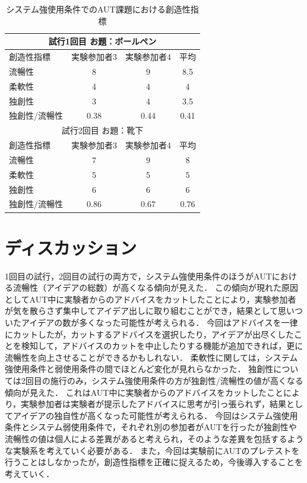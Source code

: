 \documentclass[a4paper]{jarticle}
\begin{document}
\begin{table}[h]
    \caption{システム強使用条件でのAUT課題における創造性指標}
    \label{table:strong}
    \centering
    \begin{tabular}{lccc}
      \hline
      \multicolumn{4}{c}{試行1回目 お題：ボールペン} \\
      \hline
      創造性指標  & 実験参加者3  &  実験参加者4  &  平均 \\
      \hline
      流暢性  & 8  & 9 & 8.5 \\
      柔軟性  & 4   & 4  & 4 \\
      独創性  & 3  & 4 & 3.5 \\
      独創性/流暢性  & 0.38 & 0.44 & 0.41 \\
      \hline
      \multicolumn{4}{c}{試行2回目 お題：靴下} \\
      \hline
      創造性指標  & 実験参加者3  &  実験参加者4  &  平均 \\
      \hline
      流暢性  & 7  & 9 & 8 \\
      柔軟性  & 5   & 5  & 5 \\
      独創性  & 6  & 6 & 6 \\
      独創性/流暢性  & 0.86 & 0.67 & 0.76 \\
      \hline
    \end{tabular}
\end{table}

\section{ディスカッション}
1回目の試行，2回目の試行の両方で，システム強使用条件のほうがAUTにおける流暢性（アイデアの総数）が高くなる傾向が見えた．
この傾向が現れた原因としてAUT中に実験者からのアドバイスをカットしたことにより，実験参加者が気を散らさず集中してアイデア出しに取り組むことができ，結果として思いついたアイデアの数が多くなった可能性が考えられる．
今回はアドバイスを一律にカットしたが，カットするアドバイスを選択したり，アイデアが出尽くしたことを検知して，アドバイスのカットを中止したりする機能が追加できれば，更に流暢性を向上させることができるかもしれない．
柔軟性に関しては，システム強使用条件と弱使用条件の間でほとんど変化が見れらなかった．
独創性については2回目の施行のみ，システム強使用条件の方が独創性/流暢性の値が高くなる傾向が見えた．
これはAUT中に実験者からのアドバイスをカットしたことにより，実験参加者は実験者が提示したアドバイスに思考が引っ張られず，結果としてアイデアの独自性が高くなった可能性が考えられる．
今回はシステム強使用条件とシステム弱使用条件で，それぞれ別の参加者がAUTを行ったが独創性や流暢性の値は個人による差異があると考えられ，そのような差異を包括するような実験系を考えていく必要がある．
また，今回は実験前にAUTのプレテストを行うことはしなかったが，創造性指標を正確に捉えるため，今後導入することを考えていく．
\end{document}
